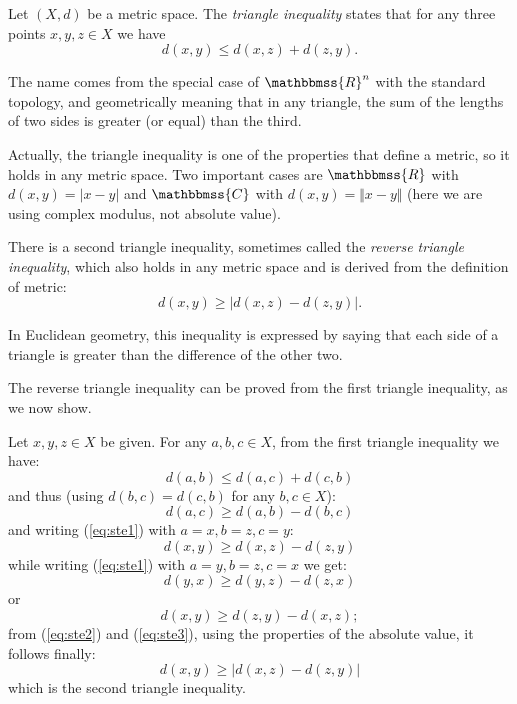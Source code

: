 \documentclass[12pt]{article}
\newcommand{\C}{\mathbbmss{C}}
\newcommand{\R}{\mathbbmss{R}}
\begin{document}
Let $(X,d)$ be a metric space. The \emph{triangle inequality} states
that for any three points $x,y,z\in X$ we have
\[
  d(x,y) \le d(x,z) + d(z,y).
\]

The name comes from the special case of $\R^n$ with the standard
topology, and geometrically meaning that in any triangle, the sum of
the lengths of two sides is greater (or equal) than the third.

Actually, the triangle inequality is one of the properties that define
a metric, so it holds in any metric space. Two important cases are
$\R$ with $d(x,y)=|x-y|$ and $\C$ with $d(x,y)=\Vert x-y\Vert$ (here
we are using complex modulus, not absolute value).

There is a second triangle inequality, sometimes called the
\emph{reverse triangle inequality}, which also holds in any metric
space and is derived from the definition of metric:
\[
  d(x,y) \ge |d(x,z) - d(z,y)|.
\]

In Euclidean geometry, this inequality is expressed by saying that each
side of a triangle is greater than the difference of the other two.

The reverse triangle inequality can be proved from the first triangle 
inequality, as we now show.

Let $x, y, z \in X$ be given. For any $a,b,c \in X$, from the first
triangle inequality we have:
\[
  d(a,b) \le d(a,c) + d(c,b)
\]
and thus (using $d(b,c) = d(c,b)$ for any $b, c \in X$):
\begin{equation}\label{eq:ste1}
d(a,c) \ge d(a,b) - d(b,c)
\end{equation}
and writing (\ref{eq:ste1}) with $a=x, b=z, c=y$:
\begin{equation}\label{eq:ste2}
d(x,y) \ge d(x,z) - d(z,y)
\end{equation}
while writing (\ref{eq:ste1}) with $a=y, b=z, c=x$ we get:
\[
  d(y,x) \ge d(y,z) - d(z,x)
\]
or
\begin{equation}\label{eq:ste3}
d(x,y) \ge d(z,y) - d(x,z);
\end{equation}
from (\ref{eq:ste2}) and (\ref{eq:ste3}), using the properties of the
absolute value, it follows finally:
\[
  d(x,y) \ge \left|d(x,z) - d(z,y)\right|
\]
which is the second triangle inequality.
\end{document}
